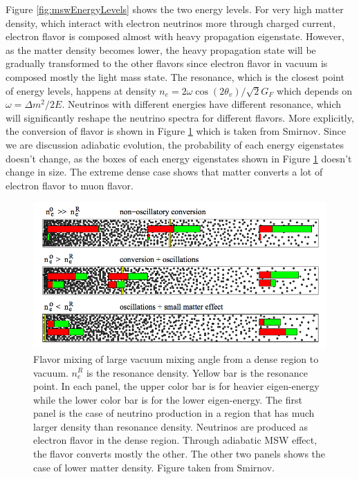Figure \ref{fig:mswEnergyLevels} shows the two energy levels. For very high matter density, which interact with electron neutrinos more through charged current, electron flavor is composed almost with heavy propagation eigenstate. However, as the matter density becomes lower, the heavy propagation state will be gradually transformed to the other flavors since electron flavor in vacuum is composed mostly the light mass state. The resonance, which is the closest point of energy levels, happens at density $n_e　 = 2\omega \cos(2\theta_v)/\sqrt{2}G_F$ which depends on $\omega = \Delta m^2/2E$. Neutrinos with different energies have different resonance, which will significantly reshape the neutrino spectra for different flavors. More explicitly, the conversion of flavor is shown in
Figure \ref{fig:msw_and_density} which is taken from Smirnov.\cite{Smirnov2003} Since we are discussion adiabatic evolution, the probability of each energy eigenstates doesn't change, as the boxes of each energy eigenstates shown in Figure \ref{fig:msw_and_density} doesn't change in size. The extreme dense case shows that matter converts a lot of electron flavor to muon flavor.

\begin{figure}
\centering
\includegraphics[width=\columnwidth]{chapters/assets/solar/msw_and_density.png}
\caption{Flavor mixing of large vacuum mixing angle from a dense region to vacuum. $n_e^R$ is the resonance density. Yellow bar is the resonance point. In each panel, the upper color bar is for heavier eigen-energy while the lower color bar is for the lower eigen-energy. The first panel is the case of neutrino production in a region that has much larger density than resonance density. Neutrinos are produced as electron flavor in the dense region. Through adiabatic MSW effect, the flavor converts mostly the other. The other two panels shows the case of lower matter density. Figure taken from Smirnov.\cite{Smirnov2003}}
\label{fig:msw_and_density}
\end{figure}



